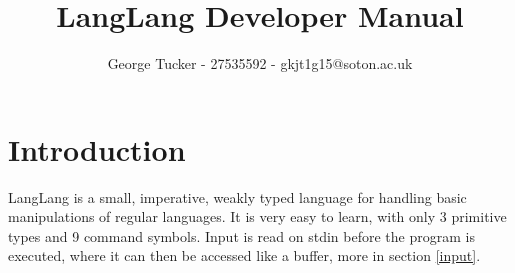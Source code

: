 \documentclass{article}
\title{LangLang Developer Manual}
\author{George Tucker - 27535592 - gkjt1g15@soton.ac.uk}
\begin{document}
\maketitle

\section{Introduction}
\begin{normalsize}
LangLang is a small, imperative, weakly typed language for handling basic manipulations of regular languages. It is very easy to learn, with only 3 primitive types and 9 command symbols. Input is read on stdin before the program is executed, where it can then be accessed like a buffer, more in section \ref{input}.
\end{normalsize}





\end{document}
